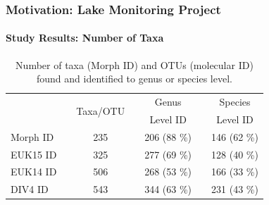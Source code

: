 \documentclass[xcolor=dvipsnames,envcountsect]{beamer}
\begin{document}
\begin{frame}\frametitle{Motivation: Lake Monitoring Project}
\framesubtitle{Study Results: Number of Taxa}

\begin{table}[htpb]\centering
\begin{tabular}{lcccccc}\toprule
&& \multirow{2}{*}{Taxa/OTU} && Genus && Species\\
&& && Level ID && Level ID \\\toprule
Morph ID && 235 && 206 (88 \%)&& 146 (62 \%) \\
EUK15 ID && 325 && 277 (69 \%) && 128 (40 \%) \\
EUK14 ID && 506 && 268 (53 \%) && 166 (33 \%) \\
DIV4 ID && 543 && 344 (63 \%) && 231 (43 \%) \\\bottomrule
\end{tabular}
\caption{Number of taxa (Morph ID) and OTUs (molecular ID) found and identified to genus or species level. } \label{Tab:Tab_2} %
\end{table}

\end{frame}
\end{document}
